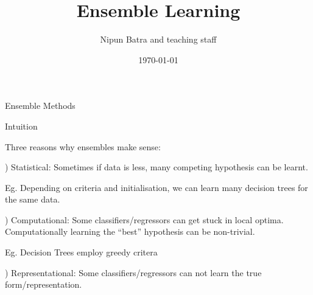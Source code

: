 \documentclass{beamer}
\title{Ensemble Learning}
\date{\today}
\author{Nipun Batra and teaching staff}
\institute{IIT Gandhinagar}
\begin{document}
	\maketitle
	
\begin{frame}{Ensemble Methods}
\end{frame}


\begin{frame}{Intuition}

Three reasons why ensembles make sense:

) Statistical: Sometimes if data is less, many competing hypothesis can be learnt. 

\pause Eg. Depending on criteria and initialisation, we can learn many decision trees for the same data. 

) Computational: Some classifiers/regressors can get stuck in local optima. Computationally learning the ``best'' hypothesis can be non-trivial.

\pause Eg. Decision Trees employ greedy critera

) Representational: Some classifiers/regressors can not learn the true form/representation.

\end{frame}
\end{document}
